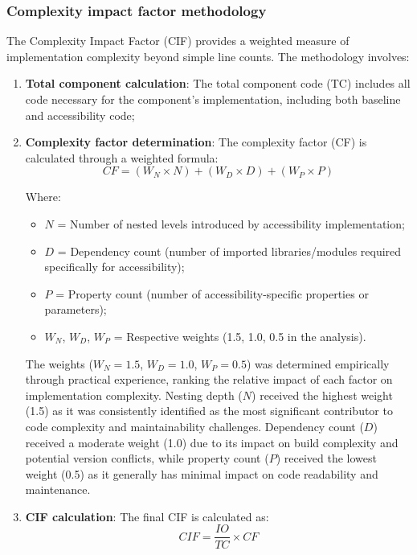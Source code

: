 \subsubsection{Complexity impact factor methodology}
\label{subsubsec:cif-methodology}

The Complexity Impact Factor (CIF) provides a weighted measure of implementation complexity beyond simple line counts. The methodology involves:

\begin{enumerate}
    \item \textbf{Total component calculation}: The total component code (TC) includes all code necessary for the component's implementation, including both baseline and accessibility code;
    
    \item \textbf{Complexity factor determination}: The complexity factor (CF) is calculated through a weighted formula:
    \begin{equation}
    CF = (W_N \times N) + (W_D \times D) + (W_P \times P)
    \end{equation}
    
    Where:
    \begin{itemize}
        \item $N$ = Number of nested levels introduced by accessibility implementation;
        \item $D$ = Dependency count (number of imported libraries/modules required specifically for accessibility);
        \item $P$ = Property count (number of accessibility-specific properties or parameters);
        \item $W_N$, $W_D$, $W_P$ = Respective weights (1.5, 1.0, 0.5 in the analysis).
    \end{itemize}

    The weights ($W_N=1.5$, $W_D=1.0$, $W_P=0.5$) was determined empirically through practical experience, ranking the relative impact of each factor on implementation complexity. Nesting depth ($N$) received the highest weight (1.5) as it was consistently identified as the most significant contributor to code complexity and maintainability challenges. Dependency count ($D$) received a moderate weight (1.0) due to its impact on build complexity and potential version conflicts, while property count ($P$) received the lowest weight (0.5) as it generally has minimal impact on code readability and maintenance.
    
    \item \textbf{CIF calculation}: The final CIF is calculated as:
    \begin{equation}
    CIF = \frac{IO}{TC} \times CF
    \end{equation}
    

\end{enumerate}
